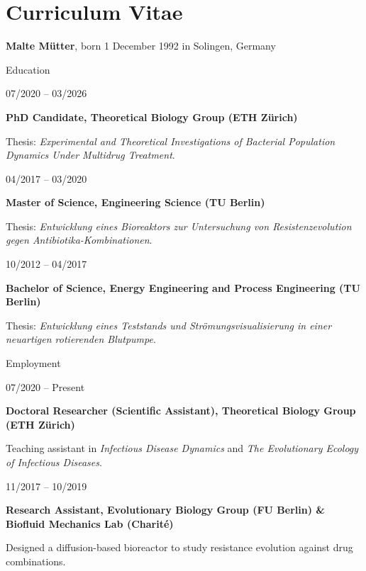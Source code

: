 
\chapter*{Curriculum Vitae}

\newcommand{\cvsection}[1]{%
  \vspace{1.2em}%
  {\small #1}\par
}

\newcommand{\cventryloc}[3]{%
  \noindent
  \begin{minipage}[t]{0.2\textwidth}
    \raggedright\small #1
  \end{minipage}\hfill
  \begin{minipage}[t]{0.8\textwidth}
    \small
    \textbf{#2}\par
    #3
  \end{minipage}\par
}

{\small \textbf{Malte Mütter}, born 1 December 1992 in Solingen, Germany}

\cvsection{Education}

\cventryloc{07/2020 -- 03/2026}{PhD Candidate, Theoretical Biology Group (ETH Zürich)}{%
  Thesis: \textit{Experimental and Theoretical Investigations of Bacterial Population Dynamics Under Multidrug Treatment}.%
}

\cventryloc{04/2017 -- 03/2020}{Master of Science, Engineering Science (TU Berlin)}{%
  Thesis: \textit{Entwicklung eines Bioreaktors zur Untersuchung von Resistenzevolution gegen Antibiotika-Kombinationen}.%
}

\cventryloc{10/2012 -- 04/2017}{Bachelor of Science, Energy Engineering and Process Engineering (TU Berlin)}{%
  Thesis: \textit{Entwicklung eines Teststands und Strömungsvisualisierung in einer neuartigen rotierenden Blutpumpe}.%
}

\cvsection{Employment}

\cventryloc{07/2020 -- Present}{Doctoral Researcher (Scientific Assistant), Theoretical Biology Group (ETH Zürich)}{%
  Teaching assistant in \textit{Infectious Disease Dynamics} and \textit{The Evolutionary Ecology of Infectious Diseases}.%
}

\cventryloc{11/2017 -- 10/2019}{Research Assistant, Evolutionary Biology Group (FU Berlin) \& Biofluid Mechanics Lab (Charité)}{%
  Designed a diffusion-based bioreactor to study resistance evolution against drug combinations.%
}

